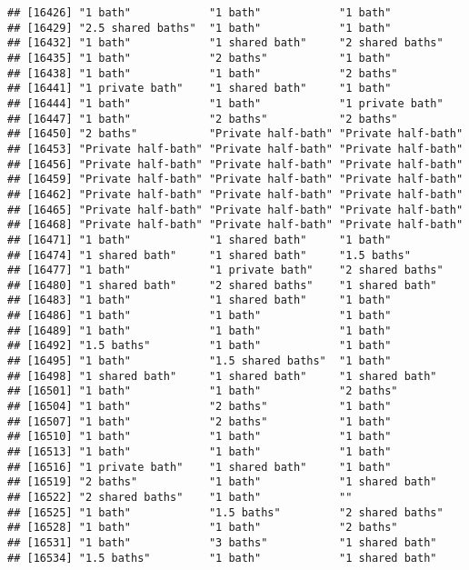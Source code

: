 \documentclass[
]{article}
\begin{document}
\begin{verbatim}
## [16426] "1 bath"            "1 bath"            "1 bath"           
## [16429] "2.5 shared baths"  "1 bath"            "1 bath"           
## [16432] "1 bath"            "1 shared bath"     "2 shared baths"   
## [16435] "1 bath"            "2 baths"           "1 bath"           
## [16438] "1 bath"            "1 bath"            "2 baths"          
## [16441] "1 private bath"    "1 shared bath"     "1 bath"           
## [16444] "1 bath"            "1 bath"            "1 private bath"   
## [16447] "1 bath"            "2 baths"           "2 baths"          
## [16450] "2 baths"           "Private half-bath" "Private half-bath"
## [16453] "Private half-bath" "Private half-bath" "Private half-bath"
## [16456] "Private half-bath" "Private half-bath" "Private half-bath"
## [16459] "Private half-bath" "Private half-bath" "Private half-bath"
## [16462] "Private half-bath" "Private half-bath" "Private half-bath"
## [16465] "Private half-bath" "Private half-bath" "Private half-bath"
## [16468] "Private half-bath" "Private half-bath" "Private half-bath"
## [16471] "1 bath"            "1 shared bath"     "1 bath"           
## [16474] "1 shared bath"     "1 shared bath"     "1.5 baths"        
## [16477] "1 bath"            "1 private bath"    "2 shared baths"   
## [16480] "1 shared bath"     "2 shared baths"    "1 shared bath"    
## [16483] "1 bath"            "1 shared bath"     "1 bath"           
## [16486] "1 bath"            "1 bath"            "1 bath"           
## [16489] "1 bath"            "1 bath"            "1 bath"           
## [16492] "1.5 baths"         "1 bath"            "1 bath"           
## [16495] "1 bath"            "1.5 shared baths"  "1 bath"           
## [16498] "1 shared bath"     "1 shared bath"     "1 shared bath"    
## [16501] "1 bath"            "1 bath"            "2 baths"          
## [16504] "1 bath"            "2 baths"           "1 bath"           
## [16507] "1 bath"            "2 baths"           "1 bath"           
## [16510] "1 bath"            "1 bath"            "1 bath"           
## [16513] "1 bath"            "1 bath"            "1 bath"           
## [16516] "1 private bath"    "1 shared bath"     "1 bath"           
## [16519] "2 baths"           "1 bath"            "1 shared bath"    
## [16522] "2 shared baths"    "1 bath"            ""                 
## [16525] "1 bath"            "1.5 baths"         "2 shared baths"   
## [16528] "1 bath"            "1 bath"            "2 baths"          
## [16531] "1 bath"            "3 baths"           "1 shared bath"    
## [16534] "1.5 baths"         "1 bath"            "1 shared bath"    

\end{verbatim}
\end{document}
